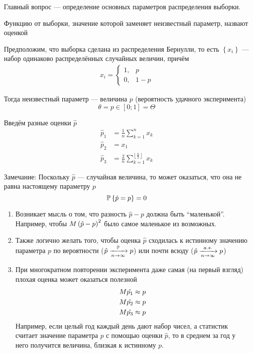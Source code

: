 Главный вопрос --- определение основных параметров распределения выборки.

\begin{definition}Функцию от выборки,
    значение которой заменяет неизвестный параметр,
    назвают оценкой
\end{definition}
\begin{example}Предположим, что выборка сделана из распределения Бернулли,
    то есть $\left\{x_i\right\}$ --- набор одинаково распределённых
    случайных величин, причём
    \begin{align*}
    x_i=
    \begin{cases}
        1,&p\\
        0,&1-p
    \end{cases}
    \end{align*}

    Тогда неизвестный параметр --- величина $p$
    (вероятность удачного эксперимента)
    $$\theta=p\in\left[0;1\right]=\Theta$$

    Введём разные оценки $\hat{p}$
    \begin{align*}
        \hat{p}_1&=\frac{1}{n}\sum_{k=1}^n x_k\\
        \hat{p}_2&=x_1\\
        \hat{p}_3&=
            \frac{2}{n}\sum_{k=1}^{\left\lfloor \frac{n}{2} \right\rfloor} x_k
    \end{align*}
\end{example}
Замечание:
Поскольку $\hat{p}$ --- случайная величина, то может оказаться,
что она не равна настоящему параметру $p$
$$\mathbb{P}\left\{ \hat{p}=p \right\}=0$$
\begin{enumerate}
    \item Возникает мысль о том, что разность $\hat{p}-p$
        должна быть ``маленькой''. Например, чтобы
        $M \left(\hat{p}-p\right)^2$ было самое маленькое из возможных.
    \item Также логично желать того,
        чтобы оценка $\hat{p}$ сходилась к истинному значению параметра $p$
        по вероятности ($\hat{p}\xrightarrow[n\to\infty]{\mathbb{P}} p$)
        или почти всюду ($\hat{p}\xrightarrow[n\to\infty]{a.s.} p$)
    \item При многократном повторении эксперимента
        даже самая (на первый взгляд) плохая оценка может оказаться полезной
        \begin{align*}
            M \hat{p_1}\approx p\\
            M \hat{p_2}\approx p\\
            M \hat{p_3}\approx p
        \end{align*}
        Например, если целый год каждый день дают набор чисел,
        а статистик считает значение параметра $p$ с помощью оценки $\hat{p}$,
        то в среднем за год у него получится величина, близкая к истинному $p$.
\end{enumerate}

